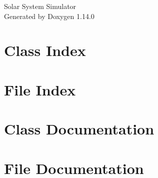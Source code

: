 \documentclass[twoside]{book}
\newcommand{\+}{\discretionary{\mbox{\scriptsize$\hookleftarrow$}}{}{}}
\newcommand{\clearemptydoublepage}{%
    \newpage{\pagestyle{empty}\cleardoublepage}%
  }
\begin{document}
  \raggedbottom
    \hypersetup{pageanchor=false,
                bookmarksnumbered=true,
                pdfencoding=unicode
               }
  \begin{titlepage}
  \vspace*{7cm}
  \begin{center}%
  {\Large Solar System Simulator}\\
  \vspace*{1cm}
  {\large Generated by Doxygen 1.14.0}\\
  \end{center}
  \end{titlepage}
  \clearemptydoublepage
  \tableofcontents
  \clearemptydoublepage
  \hypersetup{pageanchor=true}

\chapter{Class Index}

\chapter{File Index}

\chapter{Class Documentation}





\chapter{File Documentation}



























  \backmatter
  \newpage
  \clearemptydoublepage
  \printindex
\end{document}
